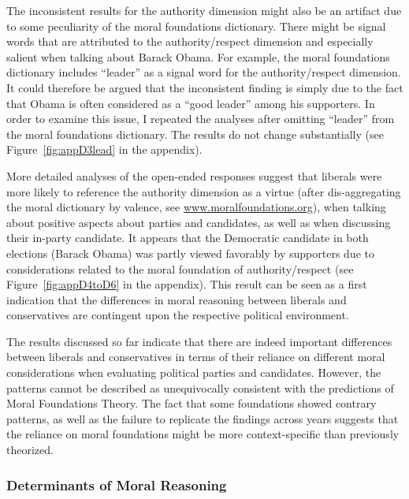 \documentclass[12pt]{article}
\begin{document}
The inconsistent results for the authority dimension might also be an artifact due to some peculiarity of the moral foundations dictionary. There might be signal words that are attributed to the authority/respect dimension and especially salient when talking about Barack Obama. For example, the moral foundations dictionary includes ``leader'' as a signal word for the authority/respect dimension. It could therefore be argued that the inconsistent finding is simply due to the fact that Obama is often considered as a ``good leader'' among his supporters. In order to examine this issue, I repeated the analyses after omitting ``leader'' from the moral foundations dictionary. The results do not change substantially (see Figure~\ref{fig:appD3lead} in the appendix).

More detailed analyses of the open-ended responses suggest that liberals were more likely to reference the authority dimension as a virtue (after dis-aggregating the moral dictionary by valence, see \url{www.moralfoundations.org}), when talking about positive aspects about parties and candidates, as well as when discussing their in-party candidate. It appears that the Democratic candidate in both elections (Barack Obama) was partly viewed favorably by supporters due to considerations related to the moral foundation of authority/respect (see Figure~\ref{fig:appD4toD6} in the appendix). This result can be seen as a first indication that the differences in moral reasoning between liberals and conservatives are contingent upon the respective political environment.

The results discussed so far indicate that there are indeed important differences between liberals and conservatives in terms of their reliance on different moral considerations when evaluating political parties and candidates. However, the patterns cannot be described as unequivocally consistent with the predictions of Moral Foundations Theory. The fact that some foundations showed contrary patterns, as well as the failure to replicate the findings across years suggests that the reliance on moral foundations might be more context-specific than previously theorized.


\subsubsection{Determinants of Moral Reasoning}
\end{document}
